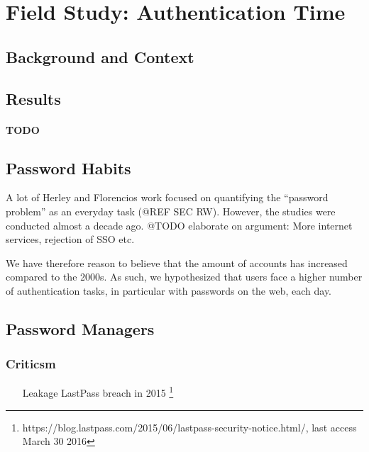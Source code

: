 
\chapter[Field Study: Authentication Time]{Field Study: Authentication Time}\label{sec:auth_time}

\section{Background and Context}
\section{Results}
\subsubsection{TODO}
 \section{Password Habits}
A lot of Herley and Florencios work focused on quantifying the ``password problem'' as an everyday task (@REF SEC RW). However, the studies were conducted almost a decade ago. @TODO elaborate on argument: More internet services, rejection of SSO etc.

We have therefore reason to believe that the amount of accounts has increased compared to the 2000s. As such, we hypothesized that users face a higher number of authentication tasks, in particular with passwords on the web, each day. 


\section{Password Managers}

\subsection{Criticsm}
\begin{itemize}
\item[Leakage] LastPass breach in 2015 \footnote{https://blog.lastpass.com/2015/06/lastpass-security-notice.html/, last access March 30 2016}
\end{itemize}
